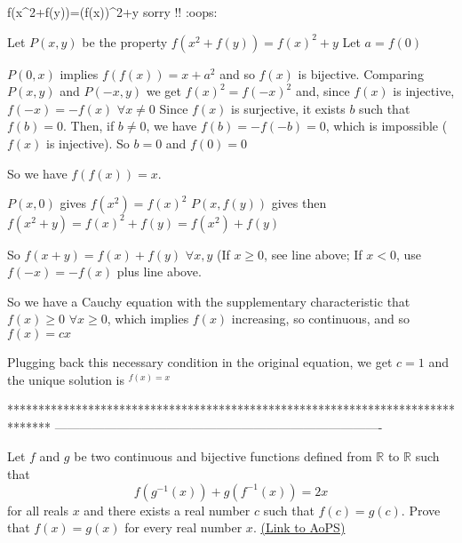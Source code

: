 \begin{solution}
	\begin{tcolorbox}f(x^2+f(y))=(f(x))^2+y sorry !!  :oops:\end{tcolorbox}

Let $ P(x,y)$ be the property $ f(x^2+f(y))=f(x)^2+y$
Let $ a=f(0)$

$ P(0,x)$ implies $ f(f(x))=x+a^2$ and so $ f(x)$ is bijective.
Comparing $ P(x,y)$ and $ P(-x,y)$ we get $ f(x)^2=f(-x)^2$ and, since $ f(x)$ is injective, $ f(-x)=-f(x)$ $ \forall x\neq 0$
Since $ f(x)$ is surjective, it exists $ b$ such that $ f(b)=0$. Then, if $ b\neq 0$, we have $ f(b)=-f(-b)=0$, which is impossible ($ f(x)$ is injective). So $ b=0$ and $ f(0)=0$

So we have $ f(f(x))=x$.

$ P(x,0)$ gives $ f(x^2)=f(x)^2$
$ P(x,f(y))$ gives then $ f(x^2+y)=f(x)^2+f(y)=f(x^2)+f(y)$

So $ f(x+y)=f(x)+f(y)$ $ \forall x,y$ (If $ x\geq 0$, see line above; If $ x<0$, use $ f(-x)=-f(x)$ plus line above.

So we have a Cauchy equation with the supplementary characteristic that $ f(x)\geq 0$ $ \forall x\geq 0$, which implies $ f(x)$ increasing, so continuous, and so $ f(x)=cx$

Plugging back this necessary condition in the original equation, we get $ c=1$ and the unique solution is $ ^\boxed{f(x)=x}$
\end{solution}
*******************************************************************************
-------------------------------------------------------------------------------

\begin{problem}
	Let $ f$ and $ g$ be two continuous and bijective functions defined from $ \mathbb R$  to $\mathbb  R$ such that $$ f(g^{ - 1}(x)) + g(f^{ -1}(x)) = 2x$$ for all reals $x$ and there exists a real number $ c$ such that $ f(c) = g(c).$
Prove that $ f(x) = g(x)$ for every real number $ x$.
	\flushright \href{https://artofproblemsolving.com/community/c6h186115}{(Link to AoPS)}
\end{problem}



